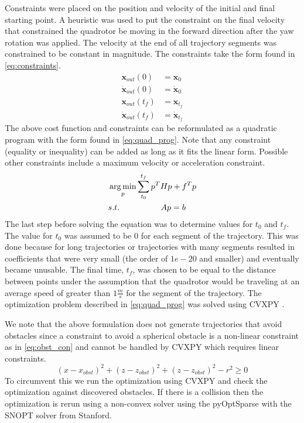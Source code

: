 \documentclass[letterpaper,conference, 10pt]{ieeeconf}
\DeclareMathOperator*{\argmin}{arg\,min}
\begin{document}
Constraints were placed on the position and velocity of the initial and final starting point. A heuristic was used to put the constraint on the final velocity that constrained the quadrotor be moving in the forward direction after the yaw rotation was applied. The velocity at the end of all trajectory segments was constrained to be constant in magnitude. The constraints take the form found in \cref{eq:constraints}.
\begin{equation}
\begin{aligned}
    \boldsymbol{x}_{out}(0) &= \boldsymbol{x}_0\\
    \boldsymbol{\dot{x}}_{out}(0) &= \boldsymbol{{\dot{x}}}_0\\
    \boldsymbol{x}_{out}(t_f) &= \boldsymbol{x}_{t_f}\\
    \boldsymbol{\dot{x}}_{out}(t_f) &= \boldsymbol{{\dot{x}}}_{t_f}
\end{aligned}
    \label{eq:constraints}
\end{equation}
The above cost function and constraints can be reformulated as a quadratic program with the form found in \cref{eq:quad_prog}. Note that any constraint (equality or inequality) can be added as long as it fits the linear form. Possible other constraints include a maximum velocity or acceleration constraint.
\begin{align}
\begin{aligned}
    &\argmin_p \sum_{t_0}^{t_f} p^T H p + f^T p\\
    \centering
    &s.t.\ \ \ \ \ \ \ \ \ \ \ \ \ \ \ Ap = b
\end{aligned}
    \label{eq:quad_prog}
\end{align}
The last step before solving the equation was to determine values for $t_0$ and $t_f$. The value for $t_0$ was assumed to be $0$ for each segment of the trajectory. This was done because for long trajectories or trajectories with many segments resulted in coefficients that were very small (the order of $1e-20$ and smaller) and eventually became unusable. The final time, $t_f$, was chosen to be equal to the distance between points under the assumption that the quadrotor would be traveling at an average speed of greater than $1\frac{m}{s}$ for the segment of the trajectory. The optimization problem described in \cref{eq:quad_prog} was solved using CVXPY \cite{cvxpy, cvxpy_rewriting}. %

We note that the above formulation does not generate trajectories that avoid obstacles since a constraint to avoid a spherical obstacle is a non-linear constraint as in \cref{eq:obst_con} and cannot be handled by CVXPY which requires linear constraints.
\begin{equation}
    (x - x_{obst})^2 + (z - z_{obst})^2 + (z - z_{obst})^2 - r^2 \geq 0
    \label{eq:obst_con}
\end{equation}
To circumvent this we run the optimization using CVXPY and check the optimization against discovered obstacles. If there is a collision then the optimization is rerun using a non-convex solver using the pyOptSparse \cite{Perez2012a} with the SNOPT solver from Stanford. 
\end{document}
